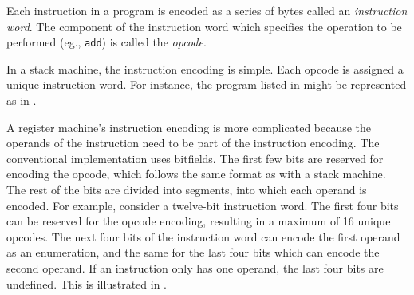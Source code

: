 			Each instruction in a program is encoded as a series of bytes called an \emph{instruction word}. The component of the instruction word which specifies the operation to be performed (eg., \texttt{add}) is called the \emph{opcode}. 
			
			In a stack machine, the instruction encoding is simple. Each opcode is assigned a unique instruction word. For instance, the program listed in  might be represented as in .
			
			A register machine's instruction encoding is more complicated because the operands of the instruction need to be part of the instruction encoding. The conventional implementation uses bitfields. The first few bits are reserved for encoding the opcode, which follows the same format as with a stack machine. The rest of the bits are divided into segments, into which each operand is encoded. For example, consider a twelve-bit instruction word. The first four bits can be reserved for the opcode encoding, resulting in a maximum of 16 unique opcodes. The next four bits of the instruction word can encode the first operand as an enumeration, and the same for the last four bits which can encode the second operand. If an instruction only has one operand, the last four bits are undefined. This is illustrated in .
			
			\begin{doublefig}
			\end{doublefig}
			
